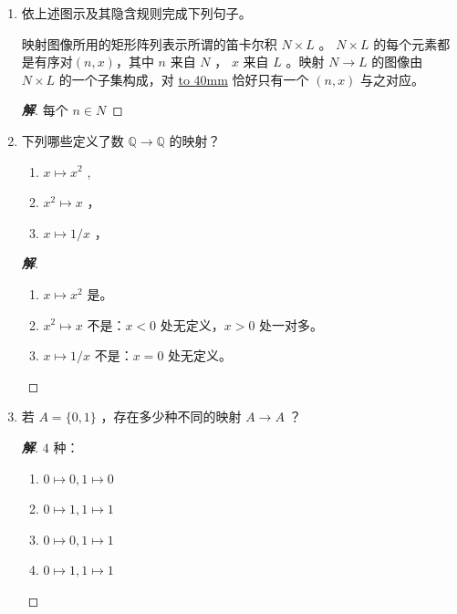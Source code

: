 \documentclass[12pt]{ctexart}
\newenvironment{solution}{\begin{proof}[\indent\bf 解]}{\end{proof}}
\begin{document}
{\begin{enumerate}
  \begin{solution}
    存在唯一的 $\ell \in L$ 与之对应
  \end{solution}
  

\item 依上述图示及其隐含规则完成下列句子。

  映射图像所用的矩形阵列表示所谓的笛卡尔积 \(N \times  L\) 。 \(N \times  L\) 的每个元素都是有序对$(n, x)$，其中 \(n\) 来自 \(N\) ， \(x\) 来自 \(L\) 。映射 \(N \rightarrow  L\) 的图像由 \(N \times  L\) 的一个子集构成，对 \underline{\hbox to 40mm{}} 恰好只有一个 $(n, x)$ 与之对应。

  \begin{solution}
    每个 $n \in N$
  \end{solution}

\item 下列哪些定义了数 \(\mathbb{Q} \rightarrow  \mathbb{Q}\) 的映射？
\begin{enumerate}
\item \(x \mapsto  {x}^{2}\) ,
\item  \({x}^{2} \mapsto  x\) ，
\item  \(x \mapsto  1/x\) ，
\end{enumerate}

\begin{solution}
\begin{enumerate}
\item \(x \mapsto  {x}^{2}\) 是。
\item  \({x}^{2} \mapsto  x\) 不是：$x <0$ 处无定义，$x>0$ 处一对多。
\item  \(x \mapsto  1/x\) 不是：$x = 0$ 处无定义。
\end{enumerate}

  
\end{solution}


\item  若 \(A = \{ 0,1\}\) ，存在多少种不同的映射 \(A \rightarrow  A\) ？

  \begin{solution}
    $4$ 种：
    \begin{enumerate}
    \item $0\mapsto 0,1 \mapsto 0$
    \item $0\mapsto 1,1 \mapsto 1$
    \item $0\mapsto 0, 1\mapsto 1$
    \item $0 \mapsto 1, 1\mapsto 1$
    \end{enumerate}
  \end{solution}


\end{enumerate}}
\end{document}
